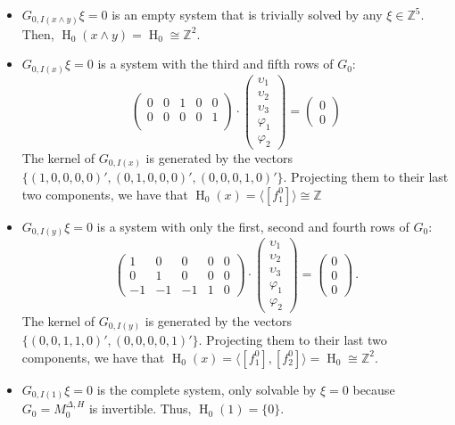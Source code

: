 \documentclass[a4paper,10pt]{article}
\newcommand{\bbz}{\mathbb{Z}}
\DeclareMathOperator{\Ho}{H}
\begin{document}
\begin{itemize}
\item \(G_{0,I(x \wedge y)}\xi = 0\) is an empty system that is trivially solved by any \(\xi \in \bbz^5\). Then, \(\Ho_0(x \wedge y) = \Ho_0 \cong \bbz^2\).
\item \(G_{0,I(x)}\xi = 0\) is a system with the third and fifth rows of \(G_{0}\):
\[
\left(
\begin{array}{rrrrr}
 0 &  0 &  1 &  0 &  0 \\
 0 &  0 &  0 &  0 &  1 \\
\end{array}
\right) \cdot 
\left(\begin{array}{r}\upsilon_1 \\\upsilon_2 \\\upsilon_3 \\\varphi_1 \\\varphi_2\end{array}\right)=
\left(\begin{array}{r}0 \\0\end{array}\right)
\]
The kernel of \(G_{0,I(x)}\) is generated by the vectors \(\{(1,0,0,0,0)',(0,1,0,0,0)',(0,0,0,1,0)'\}\). Projecting them to their last two components, we have that \(\Ho_0(x)=\langle [f^0_1]\rangle \cong \bbz\)
\item \(G_{0,I(y)}\xi = 0\) is a system with only the first, second and fourth rows of \(G_0\):
\[
\left(
\begin{array}{rrrrr}
 1 &  0 &  0 &  0 &  0 \\ 
 0 &  1 &  0 &  0 &  0 \\ 
-1 & -1 & -1 &  1 &  0 
\end{array}
\right) \cdot 
\left(\begin{array}{r} \upsilon_1  \\  \upsilon_2  \\  \upsilon_3  \\ \varphi_1  \\  \varphi_2 \end{array}\right)=
\left(\begin{array}{r}0 \\0  \\ 0 \end{array}\right)\,.
\]
The kernel of \(G_{0,I(y)}\) is generated by the vectors \(\{(0,0,1,1,0)',(0,0,0,0,1)'\}\). Projecting them to their last two components, we have that \(\Ho_0(x)=\langle [f^0_1], [f^0_2] \rangle = \Ho_0 \cong \bbz^2\).

\item \(G_{0,I(1)}\xi = 0\) is the complete system, only solvable by \(\xi = 0\) because \(G_0=M^{\Delta,H}_0\) is invertible. Thus, \(\Ho_0(1)=\{0\}\).
\end{itemize}
\end{document}
